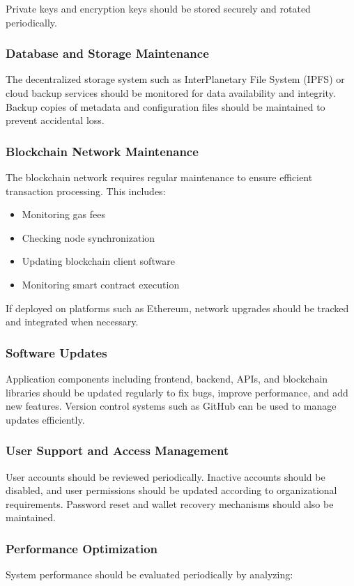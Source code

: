 \documentclass[12pt]{article}
\begin{document}
\begin{itemize}
Private keys and encryption keys should be stored securely and rotated periodically.

\subsubsection{Database and Storage Maintenance}
The decentralized storage system such as InterPlanetary File System (IPFS) or cloud backup services should be monitored for data availability and integrity. Backup copies of metadata and configuration files should be maintained to prevent accidental loss.

\subsubsection{Blockchain Network Maintenance}
The blockchain network requires regular maintenance to ensure efficient transaction processing. This includes:

\begin{itemize}
    \item Monitoring gas fees
    \item Checking node synchronization
    \item Updating blockchain client software
    \item Monitoring smart contract execution
\end{itemize}

If deployed on platforms such as Ethereum, network upgrades should be tracked and integrated when necessary.

\subsubsection{Software Updates}
Application components including frontend, backend, APIs, and blockchain libraries should be updated regularly to fix bugs, improve performance, and add new features. Version control systems such as GitHub can be used to manage updates efficiently.


\subsubsection{User Support and Access Management}
User accounts should be reviewed periodically. Inactive accounts should be disabled, and user permissions should be updated according to organizational requirements. Password reset and wallet recovery mechanisms should also be maintained.

\subsubsection{Performance Optimization}
System performance should be evaluated periodically by analyzing:


\end{itemize}
\end{document}
